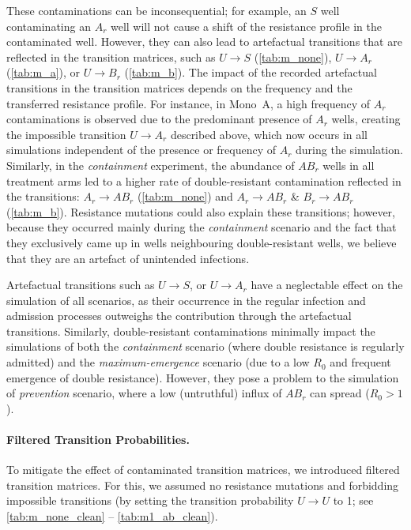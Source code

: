 These contaminations can be inconsequential; for example, an \( S \) well contaminating an \( A_r \) well will not cause a shift of the resistance profile in the contaminated well.
However, they can also lead to artefactual transitions that are reflected in the transition matrices,  such as \( U \rightarrow S \) (\autoref{tab:m_none}), \( U \rightarrow A_r \) (\autoref{tab:m_a}), or \( U \rightarrow B_r \) (\autoref{tab:m_b}).
The impact of the recorded artefactual transitions in the transition matrices depends on the frequency and the transferred resistance profile.
For instance, in Mono~A, a high frequency of \( A_r \) contaminations is observed due to the predominant presence of \( A_r \) wells, creating the impossible transition \( U \rightarrow A_r \) described above, which now occurs in all simulations independent of the presence or frequency of \(A_r\) during the simulation.
Similarly, in the \textit{containment} experiment, the abundance of \( AB_r\) wells in all treatment arms led to a higher rate of double-resistant contamination reflected in the transitions: \( A_r \rightarrow AB_r \) (\autoref{tab:m_none}) and \(A_r \rightarrow AB_r \) \& \(B_r \rightarrow AB_r \)  (\autoref{tab:m_b}).
Resistance mutations could also explain these transitions; however, because they occurred mainly during the \textit{containment} scenario and the fact that they exclusively came up in wells neighbouring double-resistant wells, we believe that they are an artefact of unintended infections.

Artefactual transitions such as \( U  \rightarrow S \), or \(U \rightarrow A_r \)
have a neglectable effect on the simulation of all scenarios, as their occurrence in the regular infection and admission processes outweighs the contribution through the artefactual transitions.
Similarly, double-resistant contaminations minimally impact the simulations of both the \textit{containment} scenario (where double resistance is regularly admitted) and the \textit{maximum-emergence} scenario (due to a low \( R_0 \) and frequent emergence of double resistance).
However, they pose a problem to the simulation of \textit{prevention} scenario, where a low (untruthful) influx of $AB_r$ can spread ($R_0 > 1$).

\paragraph{Filtered Transition Probabilities.}
To mitigate the effect of contaminated transition matrices, we introduced filtered transition matrices.
For this, we assumed no resistance mutations and forbidding impossible transitions (by setting the transition probability \( U \rightarrow U \) to 1; see \autoref{tab:m_none_clean} -- \ref{tab:m1_ab_clean}).

